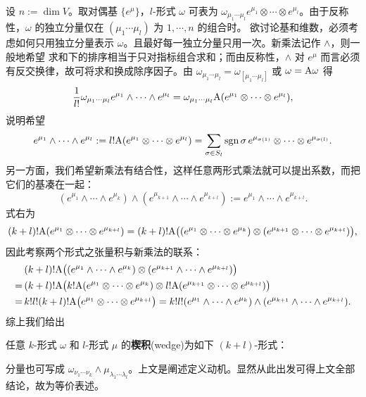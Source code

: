 设 $n:=\dim V$。取对偶基 $\{e^\mu\}$，$l$-形式 $\omega$ 可表为 $\omega_{\mu_1\cdots\mu_l} e^{\mu_1}\otimes\cdots\otimes e^{\mu_l}$。由于反称性，$\omega$ 的独立分量仅在 $(\mu_1\cdots\mu_l)$ 为 $1,\cdots,n$ 的组合时。
欲讨论基和维数，必须考虑如何只用独立分量表示 $\omega$。且最好每一独立分量只用一次。新乘法记作 $\wedge$，则一般地希望
求和下的排序相当于只对指标组合求和；而由反称性，$\wedge$ 对 $e^\mu$ 而言必须有反交换律，故可将求和换成除序因子。由 $\omega_{\mu_1\cdots\mu_l}=\omega_{[\mu_1\cdots\mu_l]}$ 或 $\omega=\mathrm{A}\omega$ 得
\[
    \frac{1}{l!}\omega_{\mu_1\cdots\mu_l} e^{\mu_1}\wedge\cdots\wedge e^{\mu_l}=\omega_{\mu_1\cdots\mu_l} \mathrm{A}(e^{\mu_1}\otimes\cdots\otimes e^{\mu_l}),
\]
说明希望
\[e^{\mu_{1}}\wedge\cdots\wedge e^{\mu_{l}}:=l!\mathrm{A}(e^{\mu_1}\otimes\cdots\otimes e^{\mu_l})=\sum_{\sigma\in S_l}\operatorname{sgn}\sigma\, e^{\mu_{\sigma(1)}}\otimes\cdots\otimes e^{\mu_{\sigma(l)}}.\]
另一方面，我们希望新乘法有结合性，这样任意两形式乘法就可以提出系数，而把它们的基凑在一起：
\[(e^{\mu_{1}}\wedge\cdots\wedge e^{\mu_{k}})\wedge( e^{\mu_{k+1}}\wedge\cdots\wedge e^{\mu_{k+l}}):= e^{\mu_{1}}\wedge\cdots\wedge e^{\mu_{k+l}}.\]
式右为
\[
(k+l)!\mathrm{A}( e^{\mu_{1}}\otimes\cdots\otimes e^{\mu_{k+l}})=(k+l)!\mathrm{A}\big(( e^{\mu_{1}}\otimes\cdots\otimes e^{\mu_{k}})\otimes( e^{\mu_{k+1}}\otimes\cdots\otimes e^{\mu_{k+l}})\big),
\]
因此考察两个形式之张量积与新乘法的联系：
\begin{align*}
    &(k+l)!\mathrm{A}\big(( e^{\mu_{1}}\wedge\cdots\wedge e^{\mu_{k}})\otimes( e^{\mu_{k+1}}\wedge\cdots\wedge e^{\mu_{k+l}})\big)\\
    =\,&(k+l)!\mathrm{A}\big(k!\mathrm{A}( e^{\mu_{1}}\otimes\cdots\otimes e^{\mu_{k}})\otimes l!\mathrm{A}( e^{\mu_{k+1}}\otimes\cdots\otimes e^{\mu_{k+l}})\big)\\
    =\,& k!l!(k+l)!\mathrm{A}\big(e^{\mu_{1}}\otimes\cdots\otimes e^{\mu_{k+l}}\big)=k!l!( e^{\mu_{1}}\wedge\cdots\wedge e^{\mu_{k}})\wedge( e^{\mu_{k+1}}\wedge\cdots\wedge e^{\mu_{k+l}}).
\end{align*}
综上我们给出
\begin{definition}
    任意 $k$-形式 $\omega$ 和 $l$-形式 $\mu$ 的\textbf{楔积}(wedge)为如下 $(k+l)$-形式：
\end{definition}
\begin{remark}
    分量也可写成 $\omega_{\nu_1\cdots\nu_k}\wedge\mu_{\lambda_1\cdots\lambda_l}$。上文是阐述定义动机。显然从此出发可得上文全部结论，故为等价表述。
\end{remark}

